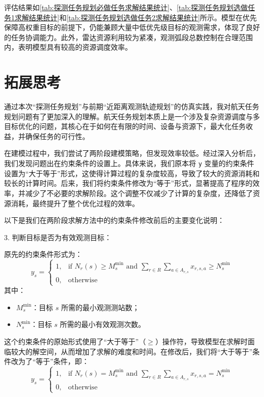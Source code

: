 \documentclass[openany,zihao=-4,UTF8]{ctexart}
\begin{document}
评估结果如\autoref{tab:探测任务规划必做任务求解结果统计}、\autoref{tab:探测任务规划选做任务1求解结果统计}和\autoref{tab:探测任务规划选做任务2求解结果统计}所示。模型在优先保障高权重目标的前提下，仍能兼顾大量中低优先级目标的观测需求，体现了良好的任务协调能力。此外，雷达资源利用较为紧凑，观测弧段总数控制在合理范围内，表明模型具有较高的资源调度效率。

\section{拓展思考}
通过本次“探测任务规划”与前期“近距离观测轨迹规划”的仿真实践，我对航天任务规划问题有了更加深入的理解。航天任务规划本质上是一个涉及复杂资源调度与多目标优化的问题，其核心在于如何在有限的时间、设备与资源下，最大化任务收益，并确保任务的可行性。

在建模过程中，我们尝试了两阶段建模策略，但发现效率较低。经过深入分析后，我们发现问题出在约束条件的设置上。具体来说，我们原本将 \texttt{y} 变量的约束条件设置为“大于等于”形式，这使得计算过程的复杂度较高，导致了较大的资源消耗和较长的计算时间。后来，我们将约束条件修改为“等于”形式，显著提高了程序的效率，并减少了不必要的求解阶段。这个调整不仅减少了计算的复杂度，还降低了资源消耗，最终提升了整个优化过程的效率。

以下是我们在两阶段求解方法中的约束条件修改前后的主要变化说明：

3. 判断目标是否为有效观测目标：

原先的约束条件形式为：
$$
y_s = 
\begin{cases}
1, & \text{if } N_r(s) \geq M_s^{\min} \text{ and } \sum_{r \in R} \sum_{a \in A_{r,s}} x_{r,s,a} \geq N_s^{\min} \\
0, & \text{otherwise}
\end{cases}
$$
其中：
\begin{itemize}
    \item $M_s^{\min}$：目标 $s$ 所需的最小观测测站数；
    \item $N_s^{\min}$：目标 $s$ 所需的最小有效观测次数。
\end{itemize}

这个约束条件的原始形式使用了“大于等于”（$\geq$）操作符，导致模型在求解时面临较大的解空间，从而增加了求解的难度和时间。在修改后，我们将“大于等于”条件改为了“等于”条件，即：
$$
y_s = 
\begin{cases}
1, & \text{if } N_r(s) = M_s^{\min} \text{ and } \sum_{r \in R} \sum_{a \in A_{r,s}} x_{r,s,a} = N_s^{\min} \\
0, & \text{otherwise}
\end{cases}
$$
\end{document}

